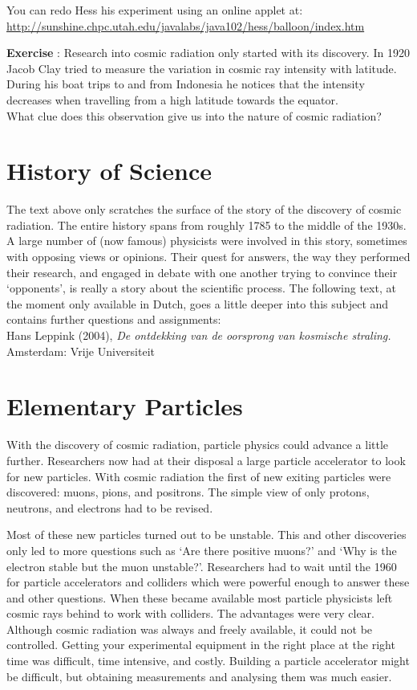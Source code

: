 You can redo Hess his experiment using an online applet at: \\
\url{http://sunshine.chpc.utah.edu/javalabs/java102/hess/balloon/index.htm}

\begin{shaded}
\textbf{Exercise \theExercise {}} : Research into cosmic radiation only started with its discovery. In 1920 Jacob Clay tried to measure the variation in cosmic ray intensity with latitude. During his boat trips to and from Indonesia he notices that the intensity decreases when travelling from a high latitude towards the equator.\\
What clue does this observation give us into the nature of cosmic radiation? \end{shaded}

\section{History of Science}
The text above only scratches the surface of the story of the discovery of cosmic radiation. The entire history spans from roughly 1785 to the middle of the 1930s. A large number of (now famous) physicists were involved in this story, sometimes with opposing views or opinions. Their quest for answers, the way they performed their research, and engaged in debate with one another trying to convince their `opponents', is really a story about the scientific process. The following text, at the moment only available in Dutch, goes a little deeper into this subject and contains further questions and assignments:\\
Hans Leppink (2004), \textit{De ontdekking van de oorsprong van kosmische straling.} Amsterdam: Vrije Universiteit

\section{Elementary Particles}
With the discovery of cosmic radiation, particle physics could advance a little further. Researchers now had at their disposal a large particle accelerator to look for new particles. With cosmic radiation the first of new exiting particles were discovered: muons, pions, and  positrons. The simple view of only protons, neutrons, and electrons had to be revised. 

Most of these new particles turned out to be unstable. This and other discoveries only led to more questions such as `Are there positive muons?' and `Why is the electron stable but the muon unstable?'. Researchers had to wait until the 1960 for particle accelerators and colliders which were powerful enough to answer these and other questions. When these became available most particle physicists left cosmic rays behind to work with colliders. The advantages were very clear. Although cosmic radiation was always and freely available, it could not be controlled. Getting your experimental equipment in the right place at the right time was difficult, time intensive, and costly. Building a particle accelerator might be difficult, but obtaining measurements and analysing them was much easier.





